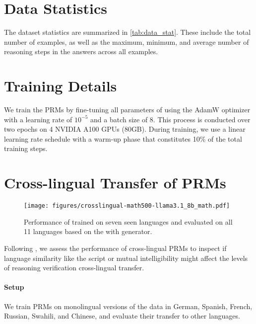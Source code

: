 
\section{Data Statistics}
\label{sec:appendix_statistics}

The dataset statistics are summarized in \autoref{tab:data_stat}. These include the total number of examples, as well as the maximum, minimum, and average number of reasoning steps in the answers across all examples.

\section{Training Details}
\label{sec:appendix_training}
We train the PRMs by fine-tuning all parameters of \qwen using the AdamW optimizer with a learning rate of $10^{-5}$ and a batch size of 8. This process is conducted over two epochs on 4 NVIDIA A100 GPUs (80GB). During training, we use a linear learning rate schedule with a warm-up phase that constitutes 10\% of the total training steps.

\section{Cross-lingual Transfer of PRMs}
\label{sec:appendix_crosslingualprm}

\begin{figure}[t]
    \centering
    \texttt{[image: figures/crosslingual-math500-llama3.1\_8b\_math.pdf]}
    \caption{Performance of \mono trained on seven seen languages and evaluated on all 11 languages based on the \mathset with \llama generator.}
    \label{fig:cross-lingual PRM}
\end{figure}

Following \citet{multiorm}, we assess the performance of cross-lingual PRMs to inspect if language similarity like the script or mutual intelligibility might affect the levels of reasoning verification cross-lingual transfer.

\paragraph{Setup}
We train PRMs on monolingual versions of the data in German, Spanish, French, Russian, Swahili, and Chinese, and evaluate their transfer to other languages.


